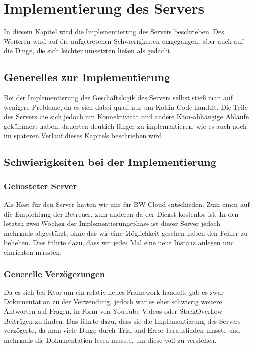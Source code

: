 
\section{Implementierung des Servers}

    In diesem Kapitel wird die Implementierung des Servers beschrieben. Des Weiteren wird auf die aufgetretenen Schwierigkeiten eingegangen, aber auch auf die Dinge, die sich leichter umsetzten ließen als gedacht.

    \subsection{Generelles zur Implementierung}

        Bei der Implementierung der Geschäftslogik des Servers selbst stieß man auf wenigere Probleme, da es sich dabei quasi nur um Kotlin-Code handelt. Die Teile des Servers die sich jedoch um Konnektivität und andere Ktor-abhängige Abläufe gekümmert haben, dauerten deutlich länger zu implementieren, wie es auch noch im späteren Verlauf dieses Kapitels beschrieben wird.

    \subsection{Schwierigkeiten bei der Implementierung}

        \subsubsection{Gehosteter Server}

            Als Host für den Server hatten wir uns für BW-Cloud entschieden. Zum einen auf die Empfehlung der Betreuer, zum anderen da der Dienst kostenlos ist.
            In den letzten zwei Wochen der Implementierungsphase ist dieser Server jedoch mehrmals abgestürzt, ohne das wir eine Möglichkeit gesehen haben den Fehler zu beheben. Dies führte dazu, dass wir jedes Mal eine neue Instanz anlegen und einrichten mussten.

        \subsubsection{Generelle Verzögerungen}

            Da es sich bei Ktor um ein relativ neues Framework handelt, gab es zwar Dokumentation zu der Verwendung, jedoch war es eher schwierig weitere Antworten auf Fragen, in Form von YouTube-Videos oder StackOverflow-Beiträgen zu finden.
            Das führte dazu, dass sie die Implementierung des Servers verzögerte, da man viele Dinge durch Trial-and-Error herausfinden musste und mehrmals die Dokumentation lesen musste, um diese voll zu verstehen.
